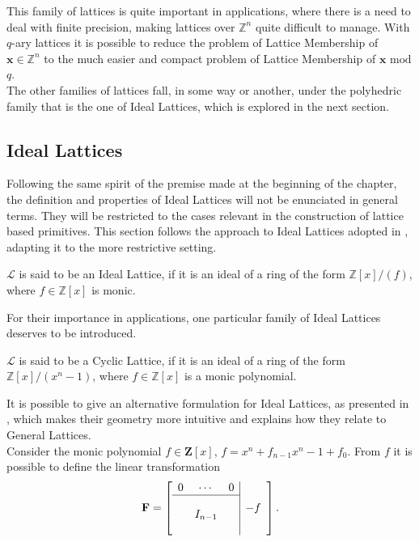 This family of lattices is quite important in applications, where there is a need to deal with finite precision, making lattices over $\mathbb{Z}^n$ quite difficult to manage. With $q$-ary lattices it is possible to reduce the problem of Lattice Membership of $\mathbf{x}\in\mathbb{Z}^n$ to the much easier and compact problem of Lattice Membership of $\mathbf{x}$ $\mathrm{mod}$ $q$.\\
The other families of lattices fall, in some way or another, under the polyhedric family that is the one of Ideal Lattices, which is explored in the next section.

\subsection{Ideal Lattices}\label{sec:bg:ideal}

Following the same spirit of the premise made at the beginning of the chapter, the definition and properties of Ideal Lattices will not be enunciated in general terms. They will be restricted to the cases relevant in the construction of lattice based primitives. This section follows the approach to Ideal Lattices adopted in \cite{ideal_lattices}, adapting it to the more restrictive setting.

\begin{definition}
$\mathscr{L}$ is said to be an Ideal Lattice, if it is an ideal of a ring of the form $\mathbb{Z}[x]/(f)$, where $f\in\mathbb{Z}[x]$ is monic.\\
\end{definition}

For their importance in applications, one particular family of Ideal Lattices deserves to be introduced.

\begin{definition}
$\mathscr{L}$ is said to be a Cyclic Lattice, if it is an ideal of a ring of the form $\mathbb{Z}[x]/(x^n-1)$, where $f\in\mathbb{Z}[x]$ is a monic polynomial.\\
\end{definition}

It is possible to give an alternative formulation for Ideal Lattices, as presented in \cite{PQC}, which makes their geometry more intuitive and explains how they relate to General Lattices.\\
Consider the monic polynomial $f\in\mathbf{Z}[x]$, $f=x^n+f_{n-1}x^n-1 + f_0$. From $f$ it is possible to define the linear transformation
\begin{equation*}
\mathbf{F}=
\left[\begin{array}{ccc|c}
0&\cdots&0&\multirow{4}{*}{$-f$}\\
\cline{1-3}
&&&\\
&I_{n-1}&&\\
&&&
\end{array}\right].
\end{equation*}


